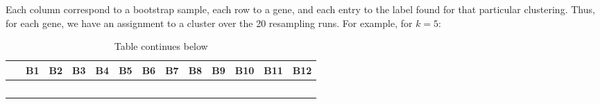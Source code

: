 \documentclass[9pt,a4paper,]{extarticle}
\begin{document}
Each column correspond to a bootstrap sample, each row to a gene, and each
entry to the label found for that particular clustering. Thus, for each gene,
we have an assignment to a cluster over the 20 resampling runs. For example,
for \(k=5\):

\begin{longtable}[]{@{}ccccccccccccc@{}}
\caption{Table continues below}\tabularnewline
\toprule
\begin{minipage}[b]{0.13\columnwidth}\centering
~\strut
\end{minipage} & \begin{minipage}[b]{0.04\columnwidth}\centering
B1\strut
\end{minipage} & \begin{minipage}[b]{0.04\columnwidth}\centering
B2\strut
\end{minipage} & \begin{minipage}[b]{0.04\columnwidth}\centering
B3\strut
\end{minipage} & \begin{minipage}[b]{0.04\columnwidth}\centering
B4\strut
\end{minipage} & \begin{minipage}[b]{0.04\columnwidth}\centering
B5\strut
\end{minipage} & \begin{minipage}[b]{0.04\columnwidth}\centering
B6\strut
\end{minipage} & \begin{minipage}[b]{0.04\columnwidth}\centering
B7\strut
\end{minipage} & \begin{minipage}[b]{0.04\columnwidth}\centering
B8\strut
\end{minipage} & \begin{minipage}[b]{0.04\columnwidth}\centering
B9\strut
\end{minipage} & \begin{minipage}[b]{0.05\columnwidth}\centering
B10\strut
\end{minipage} & \begin{minipage}[b]{0.05\columnwidth}\centering
B11\strut
\end{minipage} & \begin{minipage}[b]{0.05\columnwidth}\centering
B12\strut
\end{minipage}\tabularnewline
\midrule
\endfirsthead
\toprule
\begin{minipage}[b]{0.13\columnwidth}\centering
~\strut
\end{minipage} & \begin{minipage}[b]{0.04\columnwidth}\centering

\end{minipage}
\end{longtable}
\end{document}
